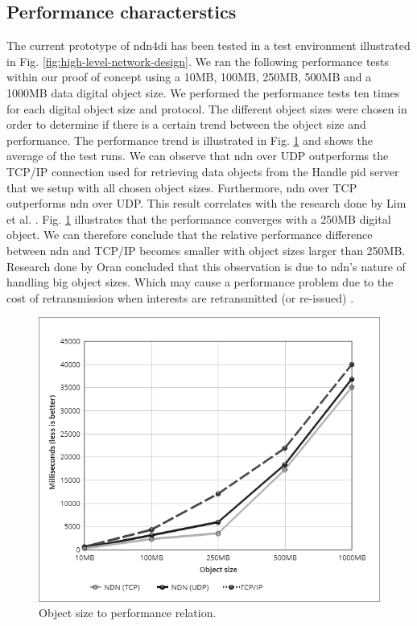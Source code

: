 \documentclass[conference]{IEEEtran}
\begin{document}
\subsection{Performance characterstics}
The current prototype of \gls{ndn4di} has been tested in a test environment illustrated in Fig. \ref{fig:high-level-network-design}. We ran the following performance tests within our proof of concept using a 10MB, 100MB, 250MB, 500MB and a 1000MB data digital object size. We performed the performance tests ten times for each digital object size and protocol. The different object sizes were chosen in order to determine if there is a certain trend between the object size and performance. The performance trend is illustrated in Fig. \ref{fig:perftest-6} and shows the average of the test runs. We can observe that \gls{ndn} over UDP outperforms the TCP/IP connection used for retrieving data objects from the Handle \gls{pid} server that we setup with all chosen object sizes. Furthermore, \gls{ndn} over TCP outperforms \gls{ndn} over UDP. This result correlates with the research done by Lim et al. \cite{lim2018ndn}. Fig. \ref{fig:perftest-6} illustrates that the performance converges with a 250MB digital object. We can therefore conclude that the relative performance difference between \gls{ndn} and TCP/IP becomes smaller with object sizes larger than 250MB. Research done by Oran concluded that this observation is due to \gls{ndn}'s nature of handling big object sizes. Which may cause a performance problem due to the cost of retransmission when interests are retransmitted (or re-issued) \cite{ndn-objects}.

\begin{figure}[H]
\centering
\includegraphics[width=\columnwidth]{images/linechart5.png}
\caption{Object size to performance relation.}
\label{fig:perftest-6}
\end{figure}
\end{document}

